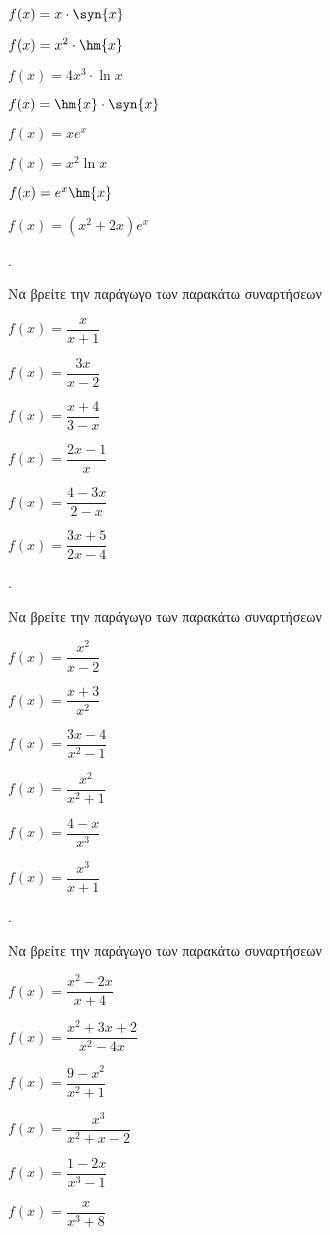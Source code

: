 \documentclass[11pt,a4paper,twocolumn]{article}
\newcounter{askhsh}
\newcommand{\askhsh}{{\large\theaskhsh.}\ \addtocounter{askhsh}{1}}
\begin{document}
\begin{multicols}{2}
\begin{alist}
\item $ f(x)=x\cdot\syn{x} $
\item $ f(x)=x^2\cdot\hm{x} $
\item $ f(x)=4x^3\cdot\ln{x} $
\item $ f(x)=\hm{x}\cdot\syn{x} $
\item $ f(x)=xe^x$
\item $ f(x)=x^2\ln{x}$
\item $ f(x)=e^x\hm{x}$
\item $ f(x)=\left(x^2+2x\right)e^x$
\end{alist}
\end{multicols}
\askhsh Να βρείτε την παράγωγο των παρακάτω συναρτήσεων
\begin{multicols}{2}
\begin{alist}
\item $ f(x)=\dfrac{x}{x+1} $
\item $ f(x)=\dfrac{3x}{x-2} $
\item $ f(x)=\dfrac{x+4}{3-x} $
\item $ f(x)=\dfrac{2x-1}{x} $
\item $ f(x)=\dfrac{4-3x}{2-x} $
\item $ f(x)=\dfrac{3x+5}{2x-4} $
\end{alist}
\end{multicols}
\askhsh Να βρείτε την παράγωγο των παρακάτω συναρτήσεων
\begin{multicols}{2}
\begin{alist}
\item $ f(x)=\dfrac{x^2}{x-2} $
\item $ f(x)=\dfrac{x+3}{x^2} $
\item $ f(x)=\dfrac{3x-4}{x^2-1} $
\item $ f(x)=\dfrac{x^2}{x^2+1} $
\item $ f(x)=\dfrac{4-x}{x^3} $
\item $ f(x)=\dfrac{x^3}{x+1} $
\end{alist}
\end{multicols}
\askhsh Να βρείτε την παράγωγο των παρακάτω συναρτήσεων
\begin{multicols}{2}
\begin{alist}
\item $ f(x)=\dfrac{x^2-2x}{x+4} $
\item $ f(x)=\dfrac{x^2+3x+2}{x^2-4x} $
\item $ f(x)=\dfrac{9-x^2}{x^2+1} $
\item $ f(x)=\dfrac{x^3}{x^2+x-2} $
\item $ f(x)=\dfrac{1-2x}{x^3-1} $
\item $ f(x)=\dfrac{x}{x^3+8} $
\end{alist}
\end{multicols}
\end{document}
